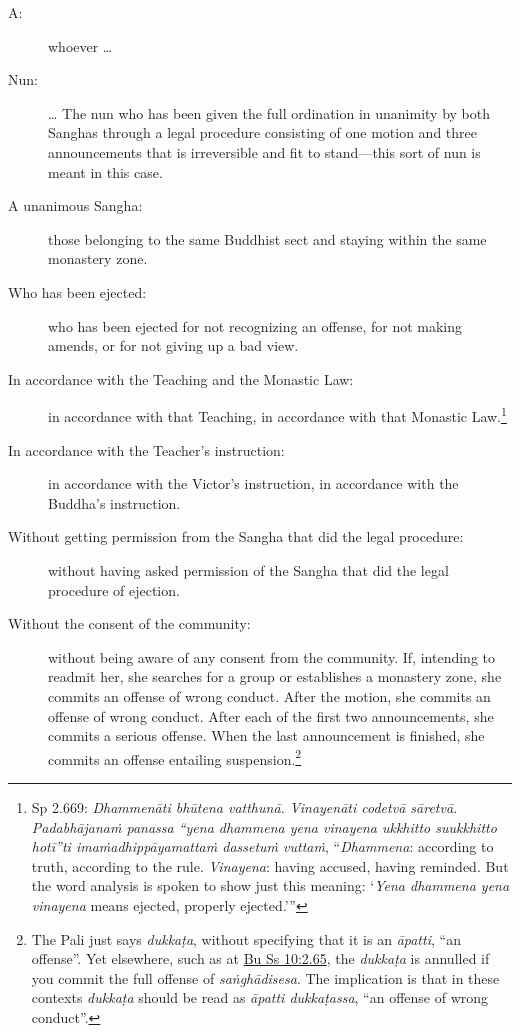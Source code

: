 \documentclass[12pt,openany]{book}%
\begin{document}
\begin{description}%
\item[A: ] whoever … %
\item[Nun: ] … The nun who has been given the full ordination in unanimity by both Sanghas through a legal procedure consisting of one motion and three announcements that is irreversible and fit to stand—this sort of nun is meant in this case. %
\item[A unanimous Sangha: ] those belonging to the same Buddhist sect and staying within the same monastery zone. %
\item[Who has been ejected: ] who has been ejected for not recognizing an offense, for not making amends, or for not giving up a bad view. %
\item[In accordance with the Teaching and the Monastic Law: ] in accordance with that Teaching, in accordance with that Monastic Law.\footnote{Sp 2.669: \textit{\textsanskrit{Dhammenāti} \textsanskrit{bhūtena} \textsanskrit{vatthunā}. \textsanskrit{Vinayenāti} \textsanskrit{codetvā} \textsanskrit{sāretvā}. \textsanskrit{Padabhājanaṁ} panassa “yena dhammena yena vinayena ukkhitto suukkhitto \textsanskrit{hotī}”ti \textsanskrit{imaṁadhippāyamattaṁ} \textsanskrit{dassetuṁ} \textsanskrit{vuttaṁ}}, “\textit{Dhammena}: according to truth, according to the rule. \textit{Vinayena}: having accused, having reminded. But the word analysis is spoken to show just this meaning: ‘\textit{Yena dhammena yena vinayena} means ejected, properly ejected.’” } %
\item[In accordance with the Teacher’s instruction: ] in accordance with the Victor’s instruction, in accordance with the Buddha’s instruction. %
\item[Without getting permission from the Sangha that did the legal procedure: ] without having asked permission of the Sangha that did the legal procedure of ejection. %
\item[Without the consent of the community: ] without being aware of any consent from the community. If, intending to readmit her, she searches for a group or establishes a monastery zone, she commits an offense of wrong conduct. After the motion, she commits an offense of wrong conduct. After each of the first two announcements, she commits a serious offense. When the last announcement is finished, she commits an offense entailing suspension.\footnote{The Pali just says \textit{\textsanskrit{dukkaṭa}}, without specifying that it is an \textit{\textsanskrit{āpatti}}, “an offense”. Yet elsewhere, such as at \href{https://suttacentral.net/pli-tv-bu-vb-ss10/en/brahmali\#2.65}{Bu Ss 10:2.65}, the \textit{\textsanskrit{dukkaṭa}} is annulled if you commit the full offense of \textit{\textsanskrit{saṅghādisesa}}. The implication is that in these contexts \textit{\textsanskrit{dukkaṭa}} should be read as \textit{\textsanskrit{āpatti} \textsanskrit{dukkaṭassa}}, “an offense of wrong conduct”. } %

\end{description}
\end{document}
